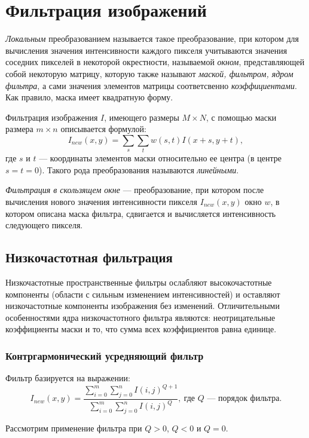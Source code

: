 \section{Фильтрация изображений}
\textit{Локальным} преобразованием называется такое преобразование, при котором для вычисления значения интенсивности каждого пикселя учитываются значения соседних пикселей в некоторой окрестности, называемой \textit{окном}, представляющей собой некоторую матрицу, которую также называют \textit{маской, фильтром, ядром фильтра}, а сами значения элементов
матрицы соответсвенно \textit{коэффициентами}. Как правило, маска имеет квадратную форму.

Фильтрация изображения $I$, имеющего размеры $M \times N$, с помощью маски размера $m \times n$ описывается формулой:
\begin{equation}
    I_{new}(x,y) = \sum_s \sum_t w(s,t) I(x+s,y+t),
\end{equation}
где $s$ и $t$ — координаты элементов маски относительно ее центра (в
центре $s = t = 0$). Такого рода преобразования называются \textit{линейными}.

\textit{Фильтрация в скользящем окне} — преобразование, при котором после вычисления нового значения интенсивности пикселя $I_{new}(x,y)$ окно $w$, в котором описана маска фильтра, сдвигается и
вычисляется интенсивность следующего пикселя.

\subsection{Низкочастотная фильтрация}
Низкочастотные пространственные фильтры ослабляют высокочастотные компоненты (области с сильным изменением интенсивностей) и оставляют низкочастотные компоненты изображения
без изменений. Отличительными особенностями
ядра низкочастотного фильтра являются: неотрицательные коэффициенты маски и то, что сумма всех коэффициентов равна единице.

\subsubsection{Контргармонический усредняющий фильтр}
Фильтр базируется на выражении:
\begin{equation}
    I_{new}(x,y) = \frac{\sum_{i=0}^m \sum_{j=0}^n I(i,j)^{Q+1}}{\sum_{i=0}^m \sum_{j=0}^n I(i,j)^Q}, \: \text{где $Q$ — порядок фильтра.}
\end{equation}


Рассмотрим применение фильтра при $Q > 0$, $Q < 0$ и
$Q = 0$.

